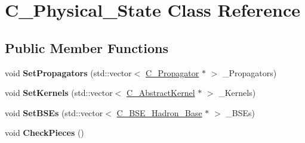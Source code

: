 \hypertarget{class_c___physical___state}{\section{C\-\_\-\-Physical\-\_\-\-State Class Reference}
\label{class_c___physical___state}
}
\subsection*{Public Member Functions}
\begin{DoxyCompactItemize}
\item 
\hypertarget{class_c___physical___state_a7c9a16f91504da6fba6c610e6f043ba7}{void {\bfseries Set\-Propagators} (std\-::vector$<$ \hyperlink{class_c___propagator}{C\-\_\-\-Propagator} $\ast$ $>$ \-\_\-\-Propagators)}\label{class_c___physical___state_a7c9a16f91504da6fba6c610e6f043ba7}

\item 
\hypertarget{class_c___physical___state_a9bc4afc2c6aefbac892af2dd8f3b0d5c}{void {\bfseries Set\-Kernels} (std\-::vector$<$ \hyperlink{class_c___abstract_kernel}{C\-\_\-\-Abstract\-Kernel} $\ast$ $>$ \-\_\-\-Kernels)}\label{class_c___physical___state_a9bc4afc2c6aefbac892af2dd8f3b0d5c}

\item 
\hypertarget{class_c___physical___state_abc9444f0b5bcb0f71c951b4cea61c45a}{void {\bfseries Set\-B\-S\-Es} (std\-::vector$<$ \hyperlink{class_c___b_s_e___hadron___base}{C\-\_\-\-B\-S\-E\-\_\-\-Hadron\-\_\-\-Base} $\ast$ $>$ \-\_\-\-B\-S\-Es)}\label{class_c___physical___state_abc9444f0b5bcb0f71c951b4cea61c45a}

\item 
\hypertarget{class_c___physical___state_aa151247bd23165fd5382747cd41d85f4}{void {\bfseries Check\-Pieces} ()}\label{class_c___physical___state_aa151247bd23165fd5382747cd41d85f4}

\end{DoxyCompactItemize}
